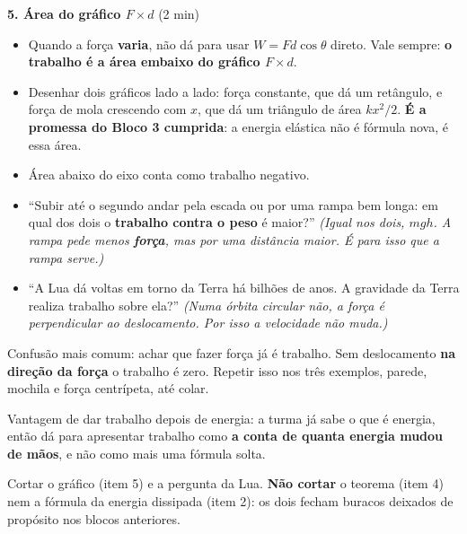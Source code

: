\documentclass[11pt,a4paper]{article}
\begin{document}
\begin{quadro}
\medskip
\textbf{5. \'Area do gr\'afico $F \times d$} (2 min)
\begin{itemize}[nosep]
  \item Quando a for\c{c}a \textbf{varia}, n\~ao d\'a para usar
        $W = Fd\cos\theta$ direto. Vale sempre:
        \textbf{o trabalho \'e a \'area embaixo do gr\'afico
        $F \times d$}.
  \item Desenhar dois gr\'aficos lado a lado: for\c{c}a constante, que
        d\'a um ret\^angulo, e for\c{c}a de mola crescendo com $x$, que
        d\'a um tri\^angulo de \'area $kx^2/2$. \textbf{\'E a promessa
        do Bloco 3 cumprida}: a energia el\'astica n\~ao \'e f\'ormula
        nova, \'e essa \'area.
  \item \'Area abaixo do eixo conta como trabalho negativo.
\end{itemize}
\end{quadro}

\begin{perguntas}
\begin{itemize}[nosep]
  \item ``Subir at\'e o segundo andar pela escada ou por uma rampa bem
        longa: em qual dos dois o \textbf{trabalho contra o peso} \'e
        maior?''
        \textit{(Igual nos dois, $mgh$. A rampa pede menos
        \textbf{for\c{c}a}, mas por uma dist\^ancia maior. \'E para
        isso que a rampa serve.)}
  \item ``A Lua d\'a voltas em torno da Terra h\'a bilh\~oes de anos. A
        gravidade da Terra realiza trabalho sobre ela?''
        \textit{(Numa \'orbita circular n\~ao, a for\c{c}a \'e
        perpendicular ao deslocamento. Por isso a velocidade n\~ao
        muda.)}
\end{itemize}
\end{perguntas}

\begin{obs}
Confus\~ao mais comum: achar que fazer for\c{c}a j\'a \'e trabalho. Sem
deslocamento \textbf{na dire\c{c}\~ao da for\c{c}a} o trabalho \'e
zero. Repetir isso nos tr\^es exemplos, parede, mochila e for\c{c}a
centr\'ipeta, at\'e colar.

Vantagem de dar trabalho depois de energia: a turma j\'a sabe o que \'e
energia, ent\~ao d\'a para apresentar trabalho como \textbf{a conta de
quanta energia mudou de m\~aos}, e n\~ao como mais uma f\'ormula solta.
\end{obs}

\begin{corte}
Cortar o gr\'afico (item 5) e a pergunta da Lua. \textbf{N\~ao cortar}
o teorema (item 4) nem a f\'ormula da energia dissipada (item 2): os
dois fecham buracos deixados de prop\'osito nos blocos anteriores.
\end{corte}
\end{document}
